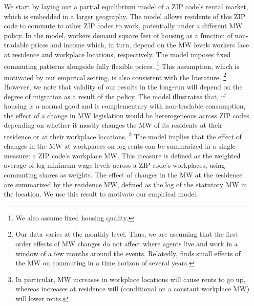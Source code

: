 We start by laying out a partial equilibrium model of a ZIP code's rental market,
which is embedded in a larger geography.
The model allows residents of this ZIP code to commute to other ZIP codes to 
work, potentially under a different MW policy.
In the model, workers demand square feet of housing as a function of non-tradable 
prices and income which, in turn, depend on the MW levels workers face at residence 
and workplace locations, respectively.
The model imposes fixed commuting patterns alongside fully flexible prices.%
\footnote{We also assume fixed housing quality.}
This assumption, which is motivated by our empirical setting, is also consistent 
with the literature.%
\footnote{Our data varies at the monthly level. 
Thus, we are assuming that the first order effects of MW changes do not affect 
where agents live and work in a window of a few months around the events.
Relatedly, \textcite{PerezPerez2021} finds small effects of the MW on commuting
in a time horizon of several years.}
However, we note that validity of our results in the long-run will depend on the
degree of migration as a result of the policy.
The model illustrates that, if housing is a normal good and is complementary 
with non-tradable consumption, the effect of a change in MW legislation 
would be heterogeneous across ZIP codes depending on whether it mostly changes 
the MW of its residents at their residence or at their workplace locations.%
\footnote{In particular, MW increases in workplace locations will cause rents to go up,
whereas increases at residence will (conditional on a constant workplace MW)
will lower rents.}
The model implies that the effect of changes in the MW at workplaces on log 
rents can be summarized in a single measure: a ZIP code's workplace MW.
This measure is defined as the weighted average of log minimum wage levels 
across a ZIP code's workplaces, using commuting shares as weights.
The effect of changes in the MW at the residence are summarized by the residence 
MW, defined as the log of the statutory MW in the location.
We use this result to motivate our empirical model.


